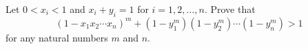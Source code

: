 Let $0<x_i<1$ and $x_i+y_i=1$ for $i=1,2,\ldots,n$. Prove that
$$(1-x_1x_2\cdots x_n)^m+(1-y_1^m)(1-y_2^m)\cdots(1-y_n^m)>1$$for any natural numbers $m$ and $n$.